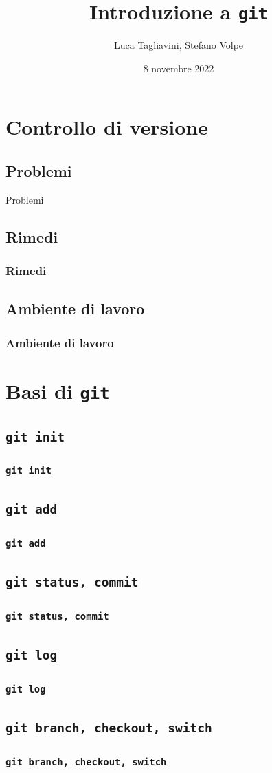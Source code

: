 \documentclass{beamer}
\title{Introduzione a \texttt{git}}
\author{Luca Tagliavini, Stefano Volpe}
\institute{Università di Bologna, corso di Laurea in Informatica}
\date{8 novembre 2022}
\begin{document}
\frame{\titlepage}

\section{Controllo di versione}
\frame{\beamer@sectionpages}

\subsection{Problemi}
\begin{frame}{Problemi}
\end{frame}

\subsection{Rimedi}
\begin{frame}
  \frametitle{Rimedi}
\end{frame}

\subsection{Ambiente di lavoro}
\begin{frame}
  \frametitle{Ambiente di lavoro}
\end{frame}

\section{Basi di \texttt{git}}
\frame{\beamer@sectionpages}

\subsection{\texttt{git init}}
\begin{frame}
  \frametitle{\texttt{git init}}
\end{frame}

\subsection{\texttt{git add}}
\begin{frame}
  \frametitle{\texttt{git add}}
\end{frame}

\subsection{\texttt{git status, commit}}
\begin{frame}
  \frametitle{\texttt{git status, commit}}
\end{frame}

\subsection{\texttt{git log}}
\begin{frame}
  \frametitle{\texttt{git log}}
\end{frame}

\subsection{\texttt{git branch, checkout, switch}}
\begin{frame}
  \frametitle{\texttt{git branch, checkout, switch}}
\end{frame}
\end{document}
